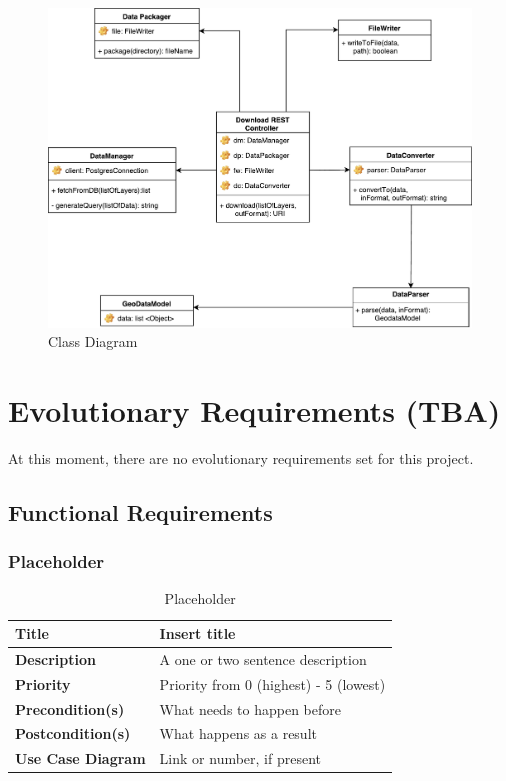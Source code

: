 \documentclass{article}
\begin{document}
\begin{figure}[H]
	\begin{center}
		\caption{Class Diagram}
		\label{class-diagram}
		\includegraphics[width=\textwidth]{images/class_diagram.pdf}
	\end{center}
\end{figure}

\clearpage

\section{Evolutionary Requirements (TBA)}

At this moment, there are no evolutionary requirements set for this project.

\subsection{Functional Requirements}


\subsubsection{Placeholder}

\begin{table}[H]
	\caption{Placeholder}
	\begin{tabularx}{\textwidth}{|l|X|}
		\hline
		\textbf{Title}            & Insert title                           \\ \hline
		\textbf{Description}      & A one or two sentence description      \\ \hline
		\textbf{Priority}         & Priority from 0 (highest) - 5 (lowest) \\ \hline
		\textbf{Precondition(s)}  & What needs to happen before            \\ \hline
		\textbf{Postcondition(s)} & What happens as a result               \\ \hline
		\textbf{Use Case Diagram} & Link or number, if present             \\  \hline
	\end{tabularx}
\end{table}
\end{document}
